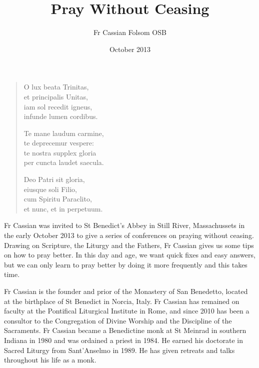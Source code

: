 \documentclass[10pt,a5paper]{book}
\title{Pray Without Ceasing}
\date{October 2013}
\author{Fr Cassian Folsom OSB}
\newenvironment{poem}
  {\begin{center}\begin{itshape}\begin{verse}
  }
  {\end{verse}\end{itshape}\end{center}
  }
\begin{document}
\maketitle

\begin{poem}
O lux beata Trinitas, \\
et principalis Unitas, \\
iam sol recedit igneus, \\
infunde lumen cordibus.

Te mane laudum carmine, \\
te deprecemur vespere: \\
te nostra supplex gloria \\
per cuncta laudet saecula.

Deo Patri sit gloria, \\
eiusque soli Filio, \\
cum Spiritu Paraclito, \\
et nunc, et in perpetuum.
\end{poem}

Fr Cassian was invited to St Benedict's Abbey in Still River, Massachussets in the early October 2013 to give a series of conferences on praying without ceasing. Drawing on Scripture, the Liturgy and the Fathers, Fr Cassian gives us some tips on how to pray better. In this day and age, we want quick fixes and easy answers, but we can only learn to pray better by doing it more frequently and this takes time.

Fr Cassian is the founder and prior of the Monastery of San Benedetto, located at the birthplace of St Benedict in Norcia, Italy. Fr Cassian has remained on faculty at the Pontifical Liturgical Institute in Rome, and since 2010 has been a consultor to the Congregation of Divine Worship and the Discipline of the Sacraments. Fr Cassian became a Benedictine monk at St Meinrad in southern Indiana in 1980 and was ordained a priest in 1984. He earned his doctorate in Sacred Liturgy from Sant'Anselmo in 1989. He has given retreats and talks throughout his life as a monk.


\end{document}
